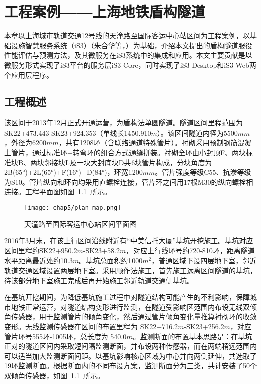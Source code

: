 \chapter{工程案例——上海地铁盾构隧道}
\label{chap:case}

本章以上海城市轨道交通12号线的天潼路至国际客运中心站区间为工程案例，以基础设施智慧服务系统（iS3）（朱合华等，\citeyear{朱合华2018智慧基础设施}）为基础，介绍本文提出的盾构隧道服役性能评估与预测方法，及其微服务在iS3系统中的集成和应用。本文主要贡献是以微服务形式实现了iS3平台的服务层iS3-Core，同时实现了iS3-Desktop和iS3-Web两个应用层程序。

\section{工程概述}

该区间于2013年12月正式开通运营，为盾构法单圆隧道。隧道区间里程范围为SK22+473.443-SK23+924.353（单线长1450.910$m$）。该区间隧道内径为5500$mm$，外径为6200$mm$，共有1208环（含联络通道特殊管片）。衬砌采用预制钢筋混凝土管片，通过标准环+转弯环的组合方式通缝拼装。衬砌全环由小封顶F、两块标准块B、两块邻接块L及一块大封底块D共6块管片构成，分块角度为2B(65°)+2L(65°)+F(16°)+D(84°)，环宽1200$mm$。管片强度等级C55、抗渗等级为S10。管片纵向和环向均采用直螺栓连接，管片环之间用17根M30的纵向螺栓相连接。工程平面图如图~\ref{fig:天潼路至国际客运中心站区间平面图}~所示。

\begin{figure}[htb!]
    \centering
    \texttt{[image: chap5/plan-map.png]}
    \caption{天潼路至国际客运中心站区间平面图}
    \label{fig:天潼路至国际客运中心站区间平面图}
\end{figure}

2016年3月末，在该上行区间沿线附近有“中美信托大厦”基坑开挖施工。基坑对应区间里程约SK22+950.2$m$-SK23+58.2$m$，对应上行线环号约720-810环，距离隧道水平距离最近处约10.3$m$。基坑总面积约1000$m^2$，普通区域下设四层地下室，邻近轨道交通区域设置两层地下室。采用顺作法施工，首先施工远离区间隧道的基坑，待该部分地下室施工完成后再开始施工邻近轨道交通侧基坑。

在基坑开挖期间，为降低基坑施工过程中对隧道结构可能产生的不利影响，保障城市地铁正常运营，对隧道结构变形进行监测，在隧道受影响区范围内布设无线双倾角传感器，用于监测管片的倾角变化，然后通过管片倾角变化量推算衬砌环的收敛变形。无线监测传感器在区间的布置里程为 SK22+716.2$m$-SK23+256.2$m$，对应管片环号555环-1005环，总长度为 540.0$m$。监测断面的布置基本思路是：在基坑正对的隧道区间内采取短间隔监测断面，并布设两种传感器，而在两端稍远范围内可以适当加大监测断面间距。以基坑影响核心区域为中心并向两侧延伸，共选取了19环监测断面。根据断面内的不同布设方案，监测断面分为三类，共计安装了50个双倾角传感器，如图~\ref{fig:天潼路至国际客运中心站区间平面图}~所示。

